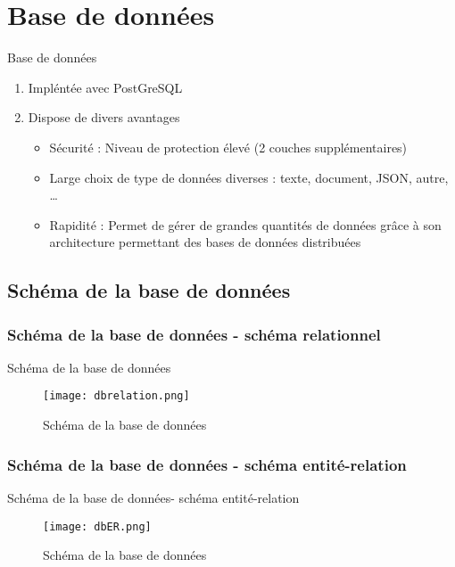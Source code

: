 \documentclass[numbering=fraction,10pt]{beamer}
\begin{document}
\section{Base de données}
\begin{frame}{Base de données}
    \begin{enumerate}
        \item Impléntée avec PostGreSQL
        \item Dispose de divers avantages
        \begin{itemize}
            \item Sécurité : Niveau de protection élevé (2 couches supplémentaires)
            \item Large choix de type de données diverses : texte, document, JSON, autre, \dots
            \item Rapidité : Permet de gérer de grandes quantités de données grâce à son architecture permettant des bases de données distribuées
        \end{itemize}
    \end{enumerate}
\end{frame}
\subsection{Schéma de la base de données}
\subsubsection{Schéma de la base de données - schéma relationnel}
\begin{frame}{Schéma de la base de données}
    \begin{figure}
        \centering
        \texttt{[image: dbrelation.png]}
        \caption{Schéma de la base de données}
    \end{figure}
\end{frame}
\subsubsection{Schéma de la base de données - schéma entité-relation}
\begin{frame}{Schéma de la base de données- schéma entité-relation}
    \begin{figure}
        \centering
        \texttt{[image: dbER.png]}
        \caption{Schéma de la base de données}
    \end{figure}
\end{frame}
\end{document}
